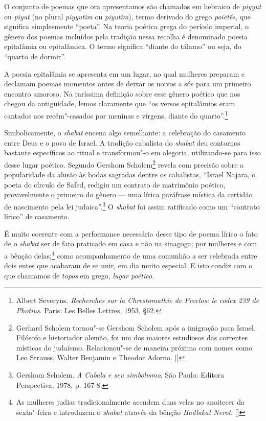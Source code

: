{\large{
O conjunto de poemas que ora apresentamos são chamados em hebraico de
\emph{piyyut} ou \emph{piyut} (no plural \emph{piyyutim} ou
\emph{piyutim}), termo derivado do grego \emph{poiētḗs}, que significa
simplesmente ``poeta''. Na
teoria poética grega do período imperial, o gênero dos poemas incluídos
pela tradição nessa recolha é denominado poesia epitalâmia ou
epitalâmica. O termo significa ``diante do tálamo'' ou seja, do ``quarto
de dormir''.


A poesia epitalâmia se apresenta em um lugar, no qual mulheres
preparam e declamam poemas momentos antes de deixar os noivos a sós para
um primeiro encontro amoroso. Na raríssima definição sobre esse gênero
poético que nos chegou da antiguidade, lemos claramente que ``os versos
epitalâmios eram cantados aos recém"-casados por meninas e virgens,
diante do quarto''.\footnote{Albert Severyns. \emph{Recherches sur la Chrestomathie de Proclos: le codex 239 de Photius}. Paris: Les Belles Lettres, 1953, §62.}

Simbolicamente, o \emph{shabat} encena algo semelhante: a celebração do
casamento entre Deus e o povo de Israel. A tradição cabalista do \emph{shabat}
deu contornos bastante específicos ao ritual e transformou"-o em
alegoria, utilizando-se para isso desse lugar poético. Segundo Gershom
Scholem\footnote{Gerhard Scholem tornou"-se Gershom Scholem após a imigração para Israel. Filósofo e historiador alemão, foi um dos maiores estudiosos das correntes místicas do judaísmo. Relacionou"-se de maneira próxima com nomes como Leo Strauss, Walter Benjamin e Theodor Adorno. []} revela com precisão sobre a popularidade da alusão às bodas
sagradas dentre os cabalistas, ``Israel Najara, o poeta do círculo de
Safed, redigiu um contrato de matrimônio poético, provavelmente o
primeiro do gênero --- uma lírica paráfrase mística da certidão de
nascimento pela lei judaica''.\footnote{Gershom Scholem. \emph{A Cabala e seu simbolismo}. São Paulo: Editora Perspectiva, 1978, p. 167-8.} O \emph{shabat} foi assim
ratificado como um ``contrato lírico'' de casamento.

É muito coerente com a performance necessária desse tipo de poema lírico
o fato de o \emph{shabat} ser de fato praticado em casa e não na sinagoga; por
mulheres e com a bênção delas;\footnote{As mulheres judias tradicionalmente acendem duas velas no anoitecer da sexta"-feira e introduzem o \emph{shabat} através da bênção \emph{Hadlakat Nerot}. []} como acompanhamento de uma comunhão a ser celebrada entre dois entes que acabaram de se unir, em dia muito
especial. E isto condiz com o que chamamos de \emph{topos} em grego,
\emph{lugar poético}.


}}
